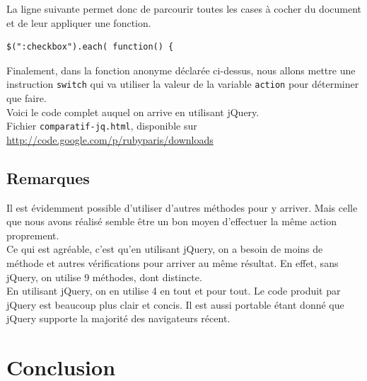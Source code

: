 \documentclass[10pt,a4paper,titlepage]{article}
\begin{document}
La ligne suivante permet donc de parcourir toutes les cases à cocher du document et de leur appliquer une fonction.

\begin{lstlisting}
$(":checkbox").each( function() {
\end{lstlisting}

Finalement, dans la fonction anonyme déclarée ci-dessus, nous allons mettre une instruction \texttt{switch} qui va utiliser la valeur de la variable \texttt{action} pour déterminer que faire.  \\

Voici le code complet auquel on arrive en utilisant jQuery. \\

Fichier \texttt{comparatif-jq.html}, disponible sur \url{http://code.google.com/p/rubyparis/downloads}



\subsection{Remarques}

Il est évidemment possible d'utiliser d'autres méthodes pour y arriver. Mais celle que nous avons réalisé semble être un bon moyen d'effectuer la même action proprement.  \\

Ce qui est agréable, c'est qu'en utilisant jQuery, on a besoin de moins de méthode et autres vérifications pour arriver au même résultat. En effet, sans jQuery, on utilise 9 méthodes, dont distincte. \\

En utilisant jQuery, on en utilise 4 en tout et pour tout. Le code produit par jQuery est beaucoup plus clair et concis. Il est aussi portable étant donné que jQuery supporte la majorité des navigateurs récent.

\newpage
\section{Conclusion}





% 
% 
% 
% 
\end{document}
